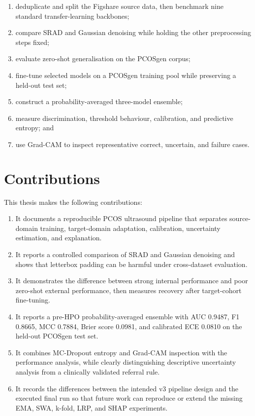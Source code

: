 \documentclass[../preamble.tex]{subfiles}
\begin{document}
\begin{enumerate}
  \item deduplicate and split the Figshare source data, then benchmark nine
        standard transfer-learning backbones;
  \item compare SRAD and Gaussian denoising while holding the other
        preprocessing steps fixed;
  \item evaluate zero-shot generalisation on the PCOSgen corpus;
  \item fine-tune selected models on a PCOSgen training pool while preserving
        a held-out test set;
  \item construct a probability-averaged three-model ensemble;
  \item measure discrimination, threshold behaviour, calibration, and
        predictive entropy; and
  \item use Grad-CAM to inspect representative correct, uncertain, and
        failure cases.
\end{enumerate}

\section{Contributions}
\label{sec:intro-contributions}

This thesis makes the following contributions:

\begin{enumerate}
  \item It documents a reproducible PCOS ultrasound pipeline that separates
        source-domain training, target-domain adaptation, calibration,
        uncertainty estimation, and explanation.
  \item It reports a controlled comparison of SRAD and Gaussian denoising and
        shows that letterbox padding can be harmful under cross-dataset
        evaluation.
  \item It demonstrates the difference between strong internal performance
        and poor zero-shot external performance, then measures recovery after
        target-cohort fine-tuning.
  \item It reports a pre-HPO probability-averaged ensemble with AUC 0.9487,
        F1 0.8665, MCC 0.7884, Brier score 0.0981, and calibrated ECE 0.0810
        on the held-out PCOSgen test set.
  \item It combines MC-Dropout entropy and Grad-CAM inspection with the
        performance analysis, while clearly distinguishing descriptive
        uncertainty analysis from a clinically validated referral rule.
  \item It records the differences between the intended v3 pipeline design
        and the executed final run so that future work can reproduce or extend
        the missing EMA, SWA, k-fold, LRP, and SHAP experiments.
\end{enumerate}
\end{document}
